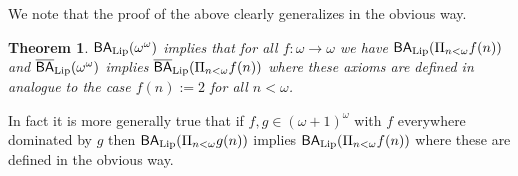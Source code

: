 \documentclass[leqno,11pt]{amsart}
\newtheorem{theorem}{Theorem}[section]
\newtheorem{lemma}[theorem]{Lemma}
\theoremstyle{definition}
\theoremstyle{remark}
\def\hook{\upharpoonright}
\def\BA{\mathsf{BA}}
\def\baire{\omega^\omega}
\def\cantor{2^\omega}
\def\mfp{\mathfrak{p}}
\begin{document}
We note that the proof of the above clearly generalizes in the obvious way.
\begin{theorem}
   $\BA_{\rm Lip} (\baire)$ implies that for all $f:\omega \to \omega$ we have $\BA_{\rm Lip}(\Pi_{n < \omega} f(n))$ and $\overline{\BA}_{\rm Lip}(\baire)$ implies $\overline{\BA}_{\rm Lip}(\Pi_{n < \omega} f(n))$ where these axioms are defined in analogue to the case $f(n):= 2$ for all $n < \omega$. 
\end{theorem}
In fact it is more generally true that if $f, g \in (\omega + 1)^\omega$ with $f$ everywhere dominated by $g$ then $\BA_{\rm Lip}(\Pi_{n < \omega} g(n))$ implies $\BA_{\rm Lip}(\Pi_{n < \omega} f(n))$ where these are defined in the obvious way. 

%
    
\end{document}
